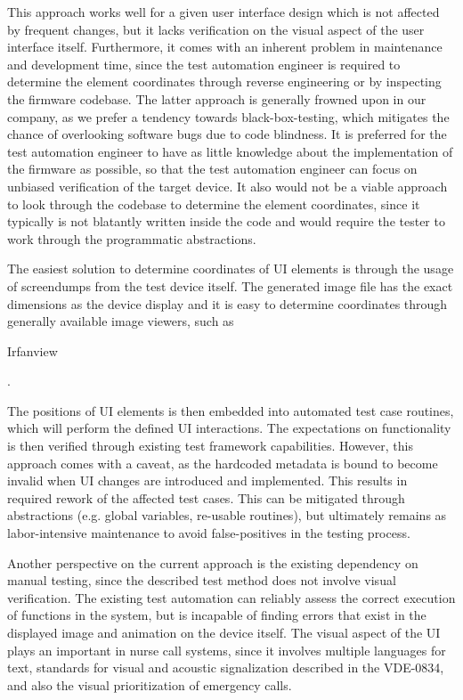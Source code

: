 \documentclass[Proposal,BIC,english,IEEE]{BASE/twbook} %
\begin{document}
This approach works well for a given user interface design which is not affected by frequent changes, but it lacks verification on the visual aspect of the user interface itself. Furthermore, it comes with an inherent problem in maintenance and development time, since the test automation engineer is required to determine the element coordinates through reverse engineering or by inspecting the firmware codebase.
The latter approach is generally frowned upon in our company, as we prefer a tendency towards black-box-testing, which mitigates the chance of overlooking software bugs due to code blindness. It is preferred for the test automation engineer to have as little knowledge about the implementation of the firmware as possible, so that the test automation engineer can focus on unbiased verification of the target device.
It also would not be a viable approach to look through the codebase to determine the element coordinates, since it typically is not blatantly written inside the code and would require the tester to work through the programmatic abstractions.

The easiest solution to determine coordinates of UI elements is through the usage of screendumps from the test device itself. The generated image file has the exact dimensions as the device display and it is easy to determine coordinates through generally available image viewers, such as \begin{em}Irfanview\end{em}.

The positions of UI elements is then embedded into automated test case routines, which will perform the defined UI interactions.
The expectations on functionality is then verified through existing test framework capabilities.
However, this approach comes with a caveat, as the hardcoded metadata is bound to become invalid when UI changes are introduced and implemented. This results in required rework of the affected test cases. This can be mitigated through abstractions (e.g. global variables, re-usable routines), but ultimately remains as labor-intensive maintenance to avoid false-positives in the testing process.

Another perspective on the current approach is the existing dependency on manual testing, since the described test method does not involve visual verification. The existing test automation can reliably assess the correct execution of functions in the system, but is incapable of finding errors that exist in the displayed image and animation on the device itself.
The visual aspect of the UI plays an important in nurse call systems, since it involves multiple languages for text, standards for visual and acoustic signalization described in the VDE-0834, and also the visual prioritization of emergency calls.
\end{document}
